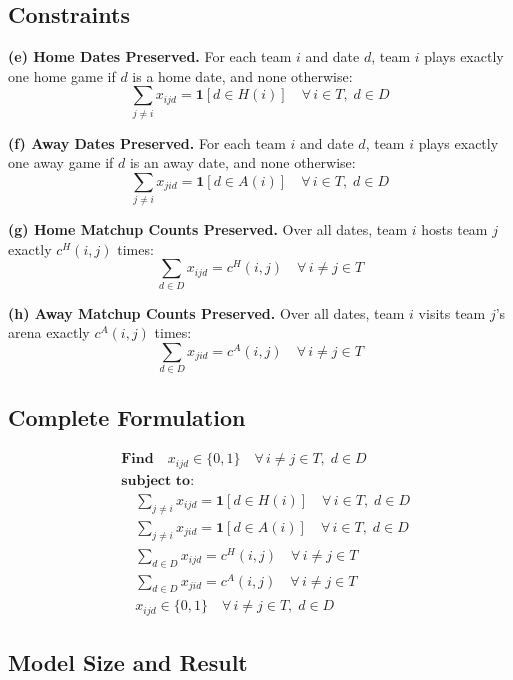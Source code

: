 \documentclass[11pt, letterpaper]{article}
\begin{document}
\subsection{Constraints}

\textbf{(e) Home Dates Preserved.}
For each team $i$ and date $d$, team $i$ plays exactly one home game if $d$ is
a home date, and none otherwise:
\[
  \sum_{j \neq i} x_{ijd} = \mathbf{1}[d \in H(i)] \quad \forall\, i \in T,\; d \in D
\]

\textbf{(f) Away Dates Preserved.}
For each team $i$ and date $d$, team $i$ plays exactly one away game if $d$ is
an away date, and none otherwise:
\[
  \sum_{j \neq i} x_{jid} = \mathbf{1}[d \in A(i)] \quad \forall\, i \in T,\; d \in D
\]

\textbf{(g) Home Matchup Counts Preserved.}
Over all dates, team $i$ hosts team $j$ exactly $c^H(i,j)$ times:
\[
  \sum_{d \in D} x_{ijd} = c^H(i,j) \quad \forall\, i \neq j \in T
\]

\textbf{(h) Away Matchup Counts Preserved.}
Over all dates, team $i$ visits team $j$'s arena exactly $c^A(i,j)$ times:
\[
  \sum_{d \in D} x_{jid} = c^A(i,j) \quad \forall\, i \neq j \in T
\]

\subsection{Complete Formulation}

\begin{align*}
  &\textbf{Find} \quad x_{ijd} \in \{0,1\} \quad \forall\, i \neq j \in T,\; d \in D \\[6pt]
  &\textbf{subject to:} \\
  &\quad \sum_{j \neq i} x_{ijd} = \mathbf{1}[d \in H(i)] \quad \forall\, i \in T,\; d \in D \tag{e} \\
  &\quad \sum_{j \neq i} x_{jid} = \mathbf{1}[d \in A(i)] \quad \forall\, i \in T,\; d \in D \tag{f} \\
  &\quad \sum_{d \in D} x_{ijd} = c^H(i,j) \quad \forall\, i \neq j \in T \tag{g} \\
  &\quad \sum_{d \in D} x_{jid} = c^A(i,j) \quad \forall\, i \neq j \in T \tag{h} \\
  &\quad x_{ijd} \in \{0,1\} \quad \forall\, i \neq j \in T,\; d \in D
\end{align*}

\subsection{Model Size and Result}
\end{document}
